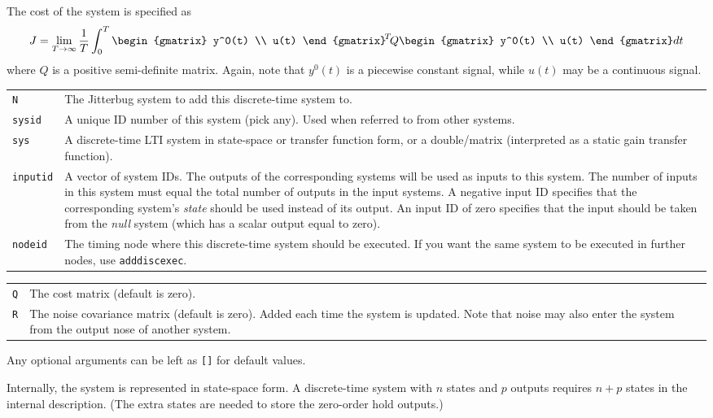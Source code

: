 \documentclass[final,twoside]{rapport}  %
\begin{document}
The cost of the system is specified as 
\[
J = \lim_{T \rightarrow \infty} \frac{1}{T} \int_0^T
  \begin{gmatrix} y^0(t) \\ u(t) \end{gmatrix}^{\!T} \!Q \begin{gmatrix}
    y^0(t) \\ u(t) \end{gmatrix} dt
\]
where $Q$ is a positive semi-definite matrix. Again, note that
$y^0(t)$ is a piecewise constant signal, while $u(t)$ may be a
continuous signal.

\args
\begin{tabularx}{\hsize}{l>{\raggedright\arraybackslash}X}
{\tt  N} &  The {\sc Jitterbug} system to add this discrete-time system to.\\
{\tt sysid} &  A unique ID number of this system (pick any). Used when
referred to from other systems. \\
{\tt sys} & A discrete-time LTI system in state-space or transfer
function form, or a double/matrix (interpreted as a static gain
transfer function).\\
{\tt inputid} & A vector of system IDs. The outputs of the
corresponding systems will be used as inputs to this system. The
number of inputs in this system must equal the total number of outputs
in the input systems. A negative input ID
          specifies that the corresponding system's {\em state} should
          be used instead of its output. An input ID of zero
          specifies that the input should be taken from the {\em null}
          system (which has a scalar output equal to zero). \\
{\tt nodeid} & The timing node where this discrete-time system should
be executed. If you want the same system to be executed in further
nodes, use {\tt adddiscexec}.
\end{tabularx}

\optargs
\begin{tabularx}{\hsize}{l>{\raggedright\arraybackslash}X}
{\tt Q} & The cost matrix (default is zero). \\
{\tt R} & The noise covariance matrix (default is zero). Added each
time the system is updated. Note that noise may also enter the system
from the output nose of another system. 
\end{tabularx}

Any optional arguments can be left as {\tt []} for default values.

\remark
Internally, the system is represented in state-space
form. A discrete-time system with $n$ states and $p$ outputs requires
$n+p$ states in the internal description. (The extra states are needed
to store the zero-order hold outputs.)
\end{document}
